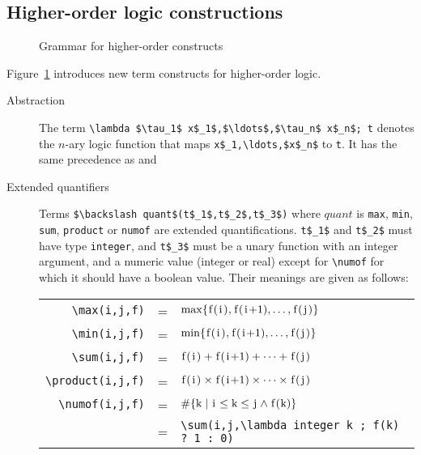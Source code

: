 \subsection{Higher-order logic constructions}
\label{sec:higherorder}

\experimental

\begin{figure}[t]
  \begin{cadre}
      
    \end{cadre}
  \caption{Grammar for higher-order constructs}
\label{fig:gram:higherorder}
\end{figure}

Figure~\ref{fig:gram:higherorder} introduces new term constructs for
higher-order logic.
\begin{description}
\item[Abstraction]
  The term \lstinline|\lambda $\tau_1$ x$_1$,$\ldots$,$\tau_n$ x$_n$; t|
  denotes the $n$-ary logic function that maps \lstinline|x$_1,\ldots,$x$_n$| to
  \lstinline|t|. It has the same precedence as \Forall and \Exists
\item[Extended quantifiers]
  Terms
 \lstinline|$\backslash quant$(t$_1$,t$_2$,t$_3$)|
  where $quant$ is \lstinline|max|,
  \lstinline|min|,
  \lstinline|sum|,
  \lstinline|product|
  or \lstinline|numof|
  are extended quantifications. \lstinline|t$_1$| and \lstinline|t$_2$| must have type
  \lstinline|integer|, and \lstinline|t$_3$| must be a unary function with an integer
  argument, and a numeric value (integer or real) except for
  \lstinline|\numof| for which it should have a boolean value. Their
  meanings are given as follows:
  \begin{tabular}{rcl}
    \lstinline|\max(i,j,f)| &=&
    $\max \{ \lstinline|f(i)|,\lstinline|f(i+1)|, \ldots, \lstinline|f(j)| \}$\\
    \lstinline|\min(i,j,f)| &=&
    $\min \{ \lstinline|f(i)|,\lstinline|f(i+1)|, \ldots, \lstinline|f(j)| \}$\\
    \lstinline|\sum(i,j,f)| &=&
    $\lstinline|f(i)|+\lstinline|f(i+1)|+\cdots+\lstinline|f(j)|$ \\
    \lstinline|\product(i,j,f)| &=&
    $\lstinline|f(i)|\times\lstinline|f(i+1)|\times\cdots\times\lstinline|f(j)|$
    \\
    \lstinline|\numof(i,j,f)| &=&
    $\#\{ \lstinline|k| \mid \lstinline|i| \leq \lstinline|k| \leq
          \lstinline|j| \land \lstinline|f(k)| \}$ \\
&=& \lstinline|\sum(i,j,\lambda integer k ; f(k) ? 1 : 0)|
  \end{tabular}


\end{description}

